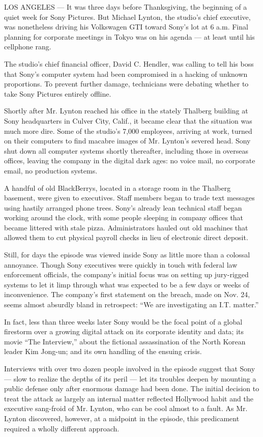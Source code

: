 LOS ANGELES --- It was three days before Thanksgiving, the beginning of
a quiet week for Sony Pictures. But Michael Lynton, the studio's chief
executive, was nonetheless driving his Volkswagen GTI toward Sony's lot
at 6 a.m. Final planning for corporate meetings in Tokyo was on his
agenda --- at least until his cellphone rang.

The studio's chief financial officer, David C. Hendler, was calling to
tell his boss that Sony's computer system had been compromised in a
hacking of unknown proportions. To prevent further damage, technicians
were debating whether to take Sony Pictures entirely offline.

Shortly after Mr. Lynton reached his office in the stately Thalberg
building at Sony headquarters in Culver City, Calif., it became clear
that the situation was much more dire. Some of the studio's 7,000
employees, arriving at work, turned on their computers to find macabre
images of Mr. Lynton's severed head. Sony shut down all computer systems
shortly thereafter, including those in overseas offices, leaving the
company in the digital dark ages: no voice mail, no corporate email, no
production systems.

A handful of old BlackBerrys, located in a storage room in the Thalberg
basement, were given to executives. Staff members began to trade text
messages using hastily arranged phone trees. Sony's already lean
technical staff began working around the clock, with some people
sleeping in company offices that became littered with stale pizza.
Administrators hauled out old machines that allowed them to cut physical
payroll checks in lieu of electronic direct deposit.

Still, for days the episode was viewed inside Sony as little more than a
colossal annoyance. Though Sony executives were quickly in touch with
federal law enforcement officials, the company's initial focus was on
setting up jury-rigged systems to let it limp through what was expected
to be a few days or weeks of inconvenience. The company's first
statement on the breach, made on Nov. 24, seems almost absurdly bland in
retrospect: ``We are investigating an I.T. matter.''

In fact, less than three weeks later Sony would be the focal point of a
global firestorm over a growing digital attack on its corporate identity
and data; its movie ``The Interview,'' about the fictional assassination
of the North Korean leader Kim Jong-un; and its own handling of the
ensuing crisis.

Interviews with over two dozen people involved in the episode suggest
that Sony --- slow to realize the depths of its peril --- let its
troubles deepen by mounting a public defense only after enormous damage
had been done. The initial decision to treat the attack as largely an
internal matter reflected Hollywood habit and the executive sang-froid
of Mr. Lynton, who can be cool almost to a fault. As Mr. Lynton
discovered, however, at a midpoint in the episode, this predicament
required a wholly different approach.

